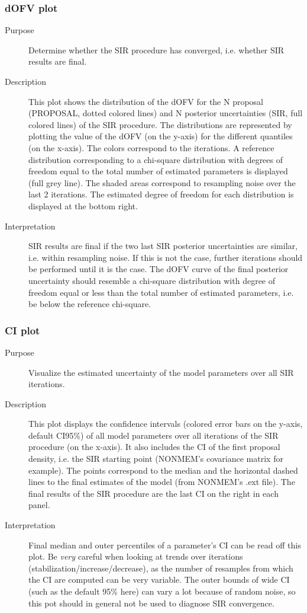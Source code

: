 \subsubsection{dOFV plot}
\begin{description}
\item[Purpose] Determine whether the SIR procedure has converged, i.e. whether SIR results are final.
\item[Description] This plot shows the distribution of the dOFV for the N proposal (PROPOSAL, dotted colored lines) and N posterior uncertainties (SIR, full colored lines) of the SIR procedure. The distributions are represented by plotting the value of the dOFV (on the y-axis) for the different quantiles (on the x-axis). The colors correspond to the iterations. A reference distribution corresponding to a chi-square distribution with degrees of freedom equal to the total number of estimated parameters is displayed (full grey line). The shaded areas correspond to resampling noise over the last 2 iterations. The estimated degree of freedom for each distribution is displayed at the bottom right.
\item[Interpretation] SIR results are final if the two last SIR posterior uncertainties are similar, i.e. within resampling noise. If this is not the case, further iterations should be performed until it is the case. The dOFV curve of the final posterior uncertainty should resemble a chi-square distribution with degree of freedom equal or less than the total number of estimated parameters, i.e. be below the reference chi-square.
\end{description}
\subsubsection{CI plot}
\begin{description}
\item[Purpose] Visualize the estimated uncertainty of the model parameters over all SIR iterations. 
\item[Description] This plot displays the confidence intervals (colored error bars on the y-axis, default CI95\%) 
of all model parameters over all iterations of the SIR procedure (on the x-axis). It also includes the CI of the first proposal density, i.e. the SIR starting point (NONMEM’s covariance matrix for example). The points correspond to the median and the horizontal dashed lines to the final estimates of the model (from NONMEM’s .ext file). The final results of the SIR procedure are the last CI on the right in each panel.
\item[Interpretation] Final median and outer percentiles of a parameter’s CI can be read off this plot. Be \emph{very} 
careful when looking at trends over iterations (stabilization/increase/decrease), as the number of resamples from which the CI are computed can be very variable. The outer bounds of wide CI (such as the default 95\% here) 
can vary a lot because of random noise, so this pot should in general not be used to diagnose SIR convergence.
\end{description}


